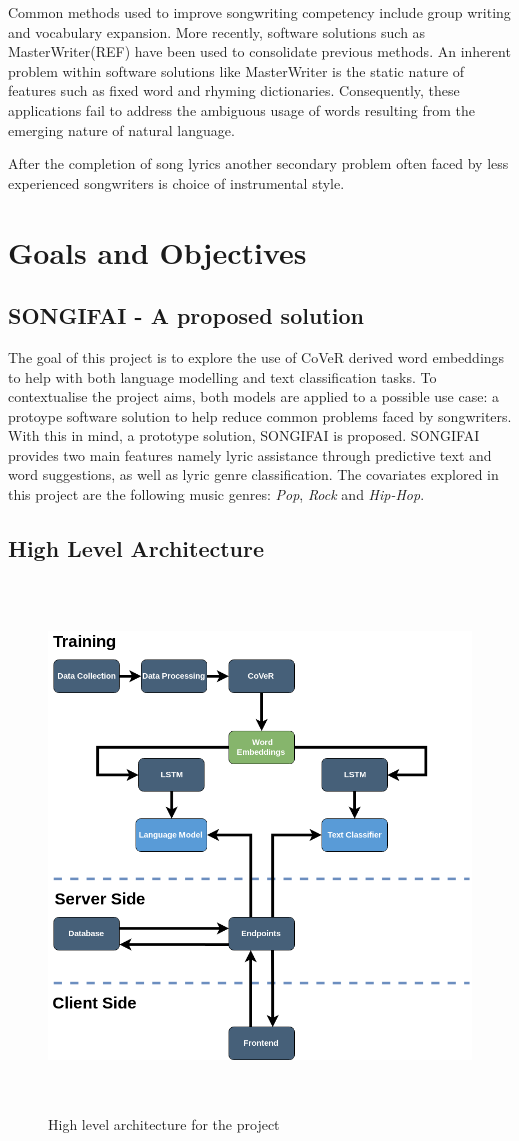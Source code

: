 \noindent
\newline
Common methods used to improve songwriting competency include group writing and vocabulary expansion. More recently, software solutions such as MasterWriter(REF) have been used to consolidate previous methods. An inherent problem within software solutions like MasterWriter is the static nature of features such as fixed word and rhyming dictionaries. Consequently, these applications fail to address the ambiguous usage of words resulting from the emerging nature of natural language.

\noindent
\newline
After the completion of song lyrics another secondary problem often faced by less experienced songwriters is choice of instrumental style. 

\section{Goals and Objectives}
\subsection{SONGIFAI - A proposed solution}
The goal of this project is to explore the use of CoVeR derived word embeddings to help with both language modelling and text classification tasks. To contextualise the project aims, both models are applied to a possible use case: a protoype software solution to help reduce common problems faced by songwriters. With this in mind, a prototype solution, SONGIFAI is proposed. SONGIFAI provides two main features namely lyric assistance through predictive text and word suggestions, as well as lyric genre classification. The covariates explored in this project are the following music genres: \textit{Pop}, \textit{Rock} and \textit{Hip-Hop}.
\subsection{High Level Architecture}
\begin{figure}[h]	
	\includegraphics[width=13cm, height=14cm]{./figures/fig7}
	\centering
	\caption{High level architecture for the project}
	\label{fig:fig7}
\end{figure}
